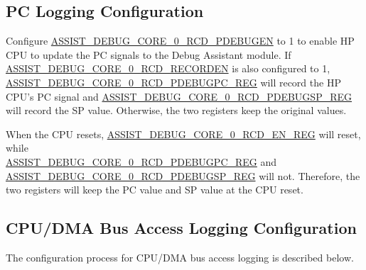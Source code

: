 \documentclass[main\_\_EN.tex]{subfiles}
\begin{document}
\subsection{PC Logging Configuration}


Configure \hyperref[fielddesc:ASSISTDEBUGCORE0RCDPDEBUGEN]{ASSIST\_DEBUG\_CORE\_0\_RCD\_PDEBUGEN} to 1 to enable HP CPU to update the PC signals to the Debug Assistant module. If \hyperref[fielddesc:ASSISTDEBUGCORE0RCDRECORDEN]{ASSIST\_DEBUG\_CORE\_0\_RCD\_RECORDEN} is also configured to 1, \\\hyperref[regdesc:ASSISTDEBUGCORE0RCDPDEBUGPCREG]{ASSIST\_DEBUG\_CORE\_0\_RCD\_PDEBUGPC\_REG} will record the HP CPU's PC signal and \hyperref[regdesc:ASSISTDEBUGCORE0RCDPDEBUGSPREG]{ASSIST\_DEBUG\_CORE\_0\_RCD\_PDEBUGSP\_REG} will record the SP value. Otherwise, the two registers keep the original values.

When the CPU resets, \hyperref[regdesc:ASSISTDEBUGCORE0RCDENREG]{ASSIST\_DEBUG\_CORE\_0\_RCD\_EN\_REG} will reset, while \\ \hyperref[regdesc:ASSISTDEBUGCORE0RCDPDEBUGPCREG]{ASSIST\_DEBUG\_CORE\_0\_RCD\_PDEBUGPC\_REG}  and \hyperref[regdesc:ASSISTDEBUGCORE0RCDPDEBUGSPREG]{ASSIST\_DEBUG\_CORE\_0\_RCD\_PDEBUGSP\_REG} will not. Therefore, the two registers will keep the PC value and SP value at the CPU reset.

\subsection{CPU/DMA Bus Access Logging Configuration}

The configuration process for CPU/DMA bus access logging is described below.
\end{document}

